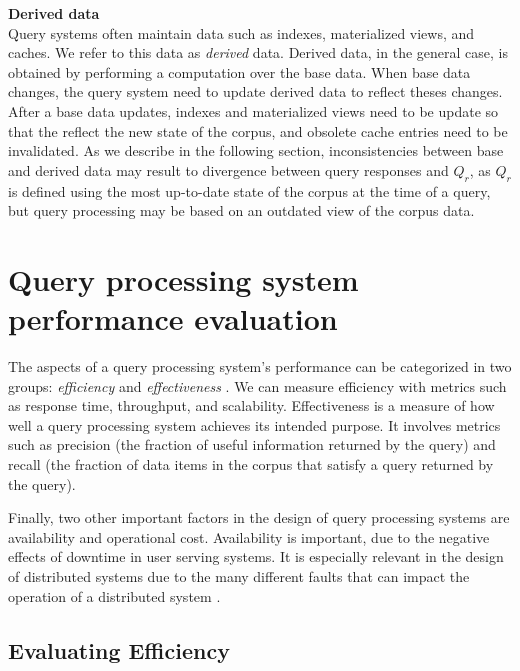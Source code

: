 \noindent
\textbf{Derived data} \\
Query systems often maintain data such as indexes, materialized views, and caches.
We refer to this data as \textit{derived} data.
Derived data, in the general case, is obtained by performing a computation over the base data.
When base data changes, the query system need to update derived data to reflect theses changes.
After a base data updates, indexes and materialized views need to be update so that the reflect the new state of the corpus,
and obsolete cache entries need to be invalidated.
As we describe in the following section, inconsistencies between base and derived data may result to divergence between
query responses and $Q_r$, as $Q_r$ is defined using the most up-to-date state of the corpus at the time of a query, but
query processing may be based on an outdated view of the corpus data.

\section{Query processing system performance evaluation}
\label{sec:requirements}


The aspects of a query processing system's performance can be categorized in two groups:
\textit{efficiency} and \textit{effectiveness} \cite{buttcher:informationretrieval}.
We can measure efficiency with metrics such as response time, throughput, and scalability.
Effectiveness is a measure of how well a query processing system achieves its intended purpose.
It involves metrics such as precision (the fraction of useful information returned by the query) and recall
(the fraction of data items in the corpus that satisfy a query returned by the query).

Finally, two other important factors in the design of query processing systems are availability and operational cost.
Availability is important, due to the negative effects of downtime in user serving systems.
It is especially relevant in the design of distributed systems due to the many different faults that can impact the
operation of a distributed system \cite{kleppmann:designing}.


\subsection{Evaluating Efficiency}

